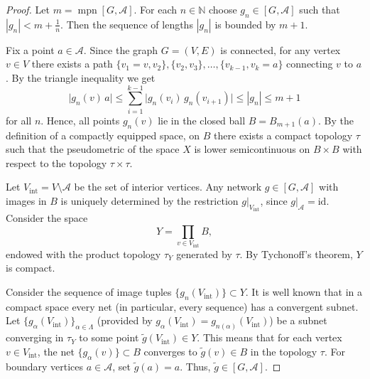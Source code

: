 \documentclass[10pt,a4paper]{amsart}
\def\mpn{\operatorname{mpn}}
\begin{document}
\begin{proof}

Let $m = \mpn[G, \mathcal{A}]$. For each $n\in \mathbb{N}$ choose $g_n\in [G, \mathcal{A}]$ such that $|g_n| < m + \frac{1}{n}$. Then the sequence of lengths $|g_n|$ is bounded by $m+1$. 

Fix a point $a\in \mathcal{A}$. Since the graph $G = (V, E)$ is connected, for any vertex $v\in V$ there exists a path $\{v_1 = v, v_2\}, \{v_2, v_3\},\ldots , \{v_{k-1}, v_k = a\}$ connecting $v$ to $a$. By the triangle inequality we get
$$
\bigl|g_n(v)\, a\bigr| \le \sum_{i=1}^{k-1} \bigl|g_n(v_i)\, g_n(v_{i+1})\bigr| \le |g_n| \le m+1
$$
for all $n$. Hence, all points $g_n(v)$ lie in the closed ball $B = B_{m+1}(a)$. By the definition of a compactly equipped space, on $B$ there exists a compact topology $\tau$ such that the pseudometric of the space $X$ is lower semicontinuous on $B\times B$ with respect to the topology $\tau\times \tau$.

Let $V_{\text{int}} = V\setminus \mathcal{A}$ be the set of interior vertices. Any network $g\in [G, \mathcal{A}]$ with images in $B$ is uniquely determined by the restriction $g|_{V_{\text{int}}}$, since $g|_{\mathcal{A}} = \mathrm{id}$. Consider the space
$$
Y = \prod_{v\in V_{\text{int}}} B,
$$
endowed with the product topology $\tau_{Y}$ generated by $\tau$. By Tychonoff's theorem, $Y$ is compact.

Consider the sequence of image tuples $\bigl\{g_n(V_{\text{int}})\bigr\}\subset Y$. It is well known that in a compact space every net (in particular, every sequence) has a convergent subnet. Let $\bigl\{g_{\alpha}(V_{\text{int}})\bigr\}_{\alpha\in \Lambda}$ (provided by $g_{\alpha}(V_{\text{int}}) = g_{n(\alpha)}(V_{\text{int}})$) be a subnet converging in $\tau_Y$ to some point $\widetilde{g}(V_{\text{int}})\in Y$. This means that for each vertex $v\in V_{\text{int}}$, the net $\bigl\{g_{\alpha}(v)\bigr\}\subset B$ converges to $\widetilde{g}(v)\in B$ in the topology $\tau$. For boundary vertices $a\in \mathcal{A}$, set $\widetilde{g}(a) = a$. Thus, $\widetilde{g}\in [G, \mathcal{A}]$.


\end{proof}
\end{document}
